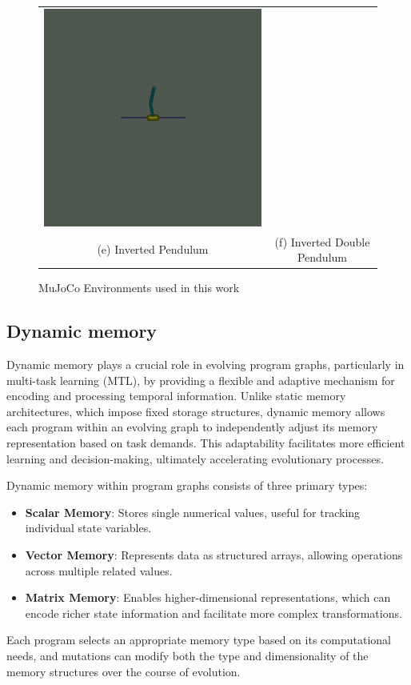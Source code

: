 \documentclass[sigconf]{acmart}
\begin{document}
\begin{figure}[h]
\begin{tabular}{cc}
    \includegraphics[width=0.3\linewidth]{assets/inverted_double_pendulum} \\
    (e) Inverted Pendulum & (f) Inverted Double Pendulum \\
  \end{tabular}
  \caption{MuJoCo Environments used in this work}
  \label{fig:mujoco_env}
\end{figure}

\subsection{Dynamic memory}
Dynamic memory plays a crucial role in evolving program graphs, particularly 
in multi-task learning (MTL), by providing a flexible and adaptive
mechanism for encoding and processing temporal information. Unlike static memory 
architectures, which impose fixed storage structures, dynamic memory allows each 
program within an evolving graph to independently adjust its memory representation 
based on task demands. This adaptability facilitates more efficient learning and 
decision-making, ultimately accelerating evolutionary processes.

Dynamic memory within program graphs consists of three primary types:
\begin{itemize}
  \item \textbf{Scalar Memory}: Stores single numerical values, useful for tracking individual state variables.
  \item \textbf{Vector Memory}: Represents data as structured arrays, allowing operations across multiple related values.
  \item \textbf{Matrix Memory}: Enables higher-dimensional representations, which can encode richer state information 
  and facilitate more complex transformations.
\end{itemize}

Each program selects an appropriate memory type based on its computational needs, 
and mutations can modify both the type and dimensionality of the memory structures over the course of evolution.
\end{document}
